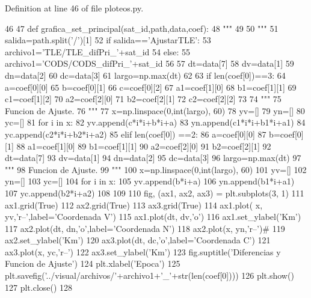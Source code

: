 \-Definition at line 46 of file ploteos.\-py.


\begin{DoxyCode}
46 
47 def grafica_set_principal(sat_id,path,data,coef):
48     """
49    
50     """
51     salida=path.split('/')[1]
52     if salida=='AjustarTLE':
53         archivo1='TLE/TLE_difPri_'+sat_id
54     else:
55         archivo1='CODS/CODS_difPri_'+sat_id
56     
57     dt=data[7]
58     dv=data[1]
59     dn=data[2]
60     dc=data[3]
61     largo=np.max(dt)
62     
63     if len(coef[0])==3:
64         a=coef[0][0]
65         b=coef[0][1]
66         c=coef[0][2]
67         a1=coef[1][0]
68         b1=coef[1][1]
69         c1=coef[1][2]
70         a2=coef[2][0]
71         b2=coef[2][1]
72         c2=coef[2][2]
73 
74         """
75         Funcion de Ajuste.
76         """
77         x=np.linspace(0,int(largo), 60)
78         yv=[]
79         yn=[]
80         yc=[]
81         for i in x:
82             yv.append(c*i*i+b*i+a)
83             yn.append(c1*i*i+b1*i+a1) 
84             yc.append(c2*i*i+b2*i+a2)            
85     elif len(coef[0]) ==2:
86         a=coef[0][0]
87         b=coef[0][1]
88         a1=coef[1][0]
89         b1=coef[1][1]
90         a2=coef[2][0]
91         b2=coef[2][1]
92         dt=data[7]
93         dv=data[1]
94         dn=data[2]
95         dc=data[3]
96         largo=np.max(dt)
97         """
98         Funcion de Ajuste.
99         """
100         x=np.linspace(0,int(largo), 60)
101         yv=[]
102         yn=[]
103         yc=[]
104         for i in x:
105             yv.append(b*i+a)
106             yn.append(b1*i+a1) 
107             yc.append(b2*i+a2)    
108     
109     
110     fig, (ax1, ax2, ax3) = plt.subplots(3, 1)
111     ax1.grid(True)
112     ax2.grid(True)
113     ax3.grid(True)
114     ax1.plot( x, yv,'r--',label='Coordenada V')
115     ax1.plot(dt, dv,'o')
116     ax1.set_ylabel('Km')
117     ax2.plot(dt, dn,'o',label='Coordenada N')
118     ax2.plot(x, yn,'r--')#
119     ax2.set_ylabel('Km')
120     ax3.plot(dt, dc,'o',label='Coordenada C')
121     ax3.plot(x, yc,'r--')
122     ax3.set_ylabel('Km')
123     fig.suptitle('Diferencias y Funcion de Ajuste')
124     plt.xlabel('Epoca')
125     plt.savefig('../visual/archivos/'+archivo1+'_'+str(len(coef[0])))
126     plt.show()
127     plt.close()
128 

\end{DoxyCode}
